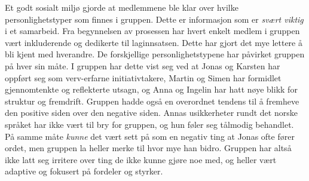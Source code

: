 Et godt sosialt miljø gjorde at medlemmene ble klar over hvilke personlighetstyper som finnes i gruppen.
Dette er informasjon som er \emph{svært viktig} i et samarbeid.
Fra begynnelsen av prosessen har hvert enkelt medlem i gruppen vært inkluderende og dedikerte til laginnsatsen. 
Dette har gjort det mye lettere å bli kjent med hverandre.
De forskjellige personlighetstypene har påvirket gruppen på hver sin måte.
I gruppen har dette vist seg ved at Jonas og Karsten har oppført seg som verv-erfarne initiativtakere,  Martin og Simen har formidlet gjennomtenkte og reflekterte utsagn, og Anna og Ingelin har hatt nøye blikk for struktur og fremdrift.
Gruppen hadde også en overordnet tendens til å fremheve den positive siden over den negative siden.
Annas usikkerheter rundt det norske språket har ikke vært til bry for gruppen, og hun føler seg tålmodig behandlet.
På samme måte \emph{kunne} det vært sett på som en negativ ting at Jonas ofte fører ordet, men gruppen la heller merke til hvor mye han bidro.
Gruppen har altså ikke latt seg irritere over ting de ikke kunne gjøre noe med, og heller vært adaptive og fokusert på fordeler og styrker.
\\